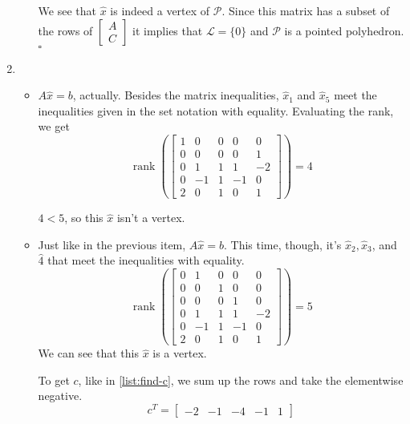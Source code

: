 \documentclass[12pt]{article}
\begin{document}
\begin{enumerate}
\begin{itemize}
                        We see that $\hat{x}$ is indeed a vertex of $\mathcal{P}$.
                        Since this matrix has a subset of the rows of $\left[\begin{array}{l}A \\ C\end{array}\right]$
                        it implies that $\mathcal{L}=\{0\}$ and $\mathcal{P}$ is a pointed polyhedron. $\square$
            \end{itemize}
      \item \begin{itemize}
                  \item $A \hat{x}=b$, actually.
                        Besides the matrix inequalities, $\hat{x}_{1}$ and $\hat{x}_{5}$
                        meet the inequalities given in the set notation with equality.
                        Evaluating the rank, we get
                        \[\operatorname{rank}\left(\left[\begin{array}{ccccc}
                                          1 & 0  & 0 & 0  & 0  \\
                                          0 & 0  & 0 & 0  & 1  \\
                                          0 & 1  & 1 & 1  & -2 \\
                                          0 & -1 & 1 & -1 & 0  \\
                                          2 & 0  & 1 & 0  & 1
                                    \end{array}\right]\right)=4\]

                        $4<5$, so this $\hat{x}$ isn't a vertex.
                  \item Just like in the previous item, $A \hat{x}=b$.
                        This time, though, it's $\hat{x}_{2}, \hat{x}_{3}$,
                        and $\hat{4}$ that meet the inequalities with equality.
                        \[\operatorname{rank}\left(\left[\begin{array}{ccccc}
                              0 & 1  & 0 & 0  & 0  \\
                              0 & 0  & 1 & 0  & 0  \\
                              0 & 0  & 0 & 1  & 0  \\
                              0 & 1  & 1 & 1  & -2 \\
                              0 & -1 & 1 & -1 & 0  \\
                              2 & 0  & 1 & 0  & 1
                        \end{array}\right]\right)=5\]
                        We can see that this $\hat{x}$ is a vertex.

                        To get $c$, like in \ref{list:find-c}, we sum up the rows and take the elementwise negative.
                        \[c^{T}=\left[\begin{array}{lllll}
                              -2 & -1 & -4 & -1 & 1
                        \end{array}\right]\]
            \end{itemize}
\end{enumerate}
\end{document}
